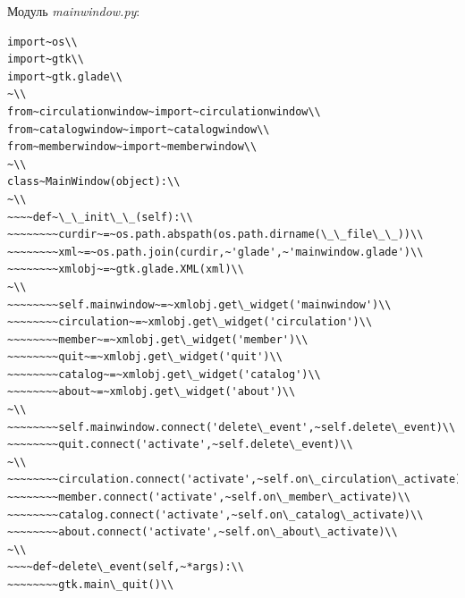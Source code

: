 \documentclass[a4paper,openany,twoside,draft]{book}
\providecommand*{\DUroletitlereference}[1]{\textsl{#1}}
\begin{document}
Модуль \DUroletitlereference{mainwindow.py}:

\begin{verbatim}
import~os\\
import~gtk\\
import~gtk.glade\\
~\\
from~circulationwindow~import~circulationwindow\\
from~catalogwindow~import~catalogwindow\\
from~memberwindow~import~memberwindow\\
~\\
class~MainWindow(object):\\
~\\
~~~~def~\_\_init\_\_(self):\\
~~~~~~~~curdir~=~os.path.abspath(os.path.dirname(\_\_file\_\_))\\
~~~~~~~~xml~=~os.path.join(curdir,~'glade',~'mainwindow.glade')\\
~~~~~~~~xmlobj~=~gtk.glade.XML(xml)\\
~\\
~~~~~~~~self.mainwindow~=~xmlobj.get\_widget('mainwindow')\\
~~~~~~~~circulation~=~xmlobj.get\_widget('circulation')\\
~~~~~~~~member~=~xmlobj.get\_widget('member')\\
~~~~~~~~quit~=~xmlobj.get\_widget('quit')\\
~~~~~~~~catalog~=~xmlobj.get\_widget('catalog')\\
~~~~~~~~about~=~xmlobj.get\_widget('about')\\
~\\
~~~~~~~~self.mainwindow.connect('delete\_event',~self.delete\_event)\\
~~~~~~~~quit.connect('activate',~self.delete\_event)\\
~\\
~~~~~~~~circulation.connect('activate',~self.on\_circulation\_activate)\\
~~~~~~~~member.connect('activate',~self.on\_member\_activate)\\
~~~~~~~~catalog.connect('activate',~self.on\_catalog\_activate)\\
~~~~~~~~about.connect('activate',~self.on\_about\_activate)\\
~\\
~~~~def~delete\_event(self,~*args):\\
~~~~~~~~gtk.main\_quit()\\

\end{verbatim}
\end{document}
